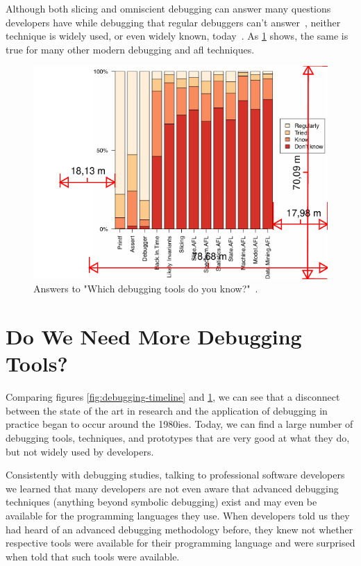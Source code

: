 Although both slicing and omniscient debugging can answer many \linebreak questions developers have while debugging that regular debuggers can't \linebreak answer~\cite{ko07:information_needs_in_collocated, storey97:how_do_program_understanding, sillito06:questions_programmers_ask}, neither technique is widely used, or even widely known, today~\cite{perscheid17:studying_the_advancement}.
As \cref{fig:tool-usage} shows, the same is true for many other modern debugging and \ac{afl} techniques.

\begin{figure}[t]
\centering
\includegraphics[width=.8\linewidth]{img/tool-usage}
\caption{Answers to "Which debugging tools do you know?"~\cite{perscheid17:studying_the_advancement}.}
\label{fig:tool-usage}
\end{figure}

\section{Do We Need More Debugging Tools?}

Comparing figures \ref{fig:debugging-timeline} and \ref{fig:tool-usage}, we can see that a disconnect between the state of the art in research and the application of debugging in practice began to occur around the 1980ies.
Today, we can find a large number of debugging tools, techniques, and prototypes that are very good at what they do, but not widely used by developers.

Consistently with debugging studies, talking to professional software developers we learned that many developers are not even aware that advanced debugging techniques (\ie anything beyond symbolic debugging) exist and may even be available for the programming languages they use.
When developers told us they had heard of an advanced debugging methodology before, they knew not whether respective tools were available for their programming language and were surprised when told that such tools were available.

